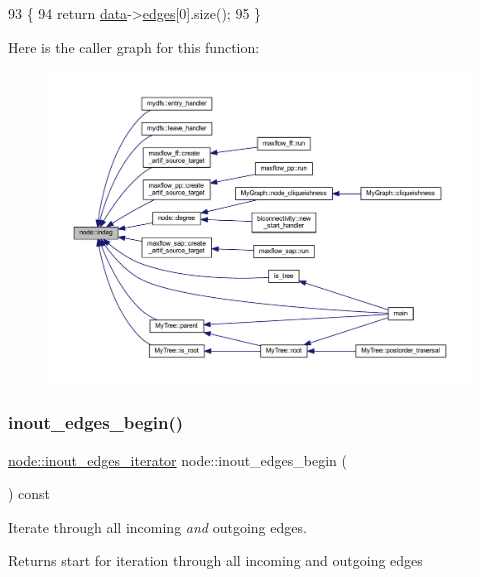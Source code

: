 \begin{DoxyCode}
93 \{
94     \textcolor{keywordflow}{return} \mbox{\hyperlink{classnode_a4ae3d54ebb61be3a102bedf5b91bef75}{data}}->\mbox{\hyperlink{classnode__data_a91690d6d2594423c2cdf8ea083c8bd75}{edges}}[0].size();
95 \}
\end{DoxyCode}
Here is the caller graph for this function\+:\nopagebreak
\begin{figure}[H]
\begin{center}
\leavevmode
\includegraphics[width=350pt]{classnode_a749bfd1316584b96f8c9b0e44ad512f0_icgraph}
\end{center}
\end{figure}
\mbox{\label{classnode_a8677f4dc2acfb64310de1ea866c17340}} 
\subsubsection{\texorpdfstring{inout\+\_\+edges\+\_\+begin()}{inout\_edges\_begin()}}
{\footnotesize\ttfamily \mbox{\hyperlink{classnode_a854d596611e6a3342090cce71cedf300}{node\+::inout\+\_\+edges\+\_\+iterator}} node\+::inout\+\_\+edges\+\_\+begin (\begin{DoxyParamCaption}{ }\end{DoxyParamCaption}) const}

Iterate through all incoming {\itshape and} outgoing edges.

\begin{DoxyReturn}{Returns}
start for iteration through all incoming and outgoing edges 
\end{DoxyReturn}


